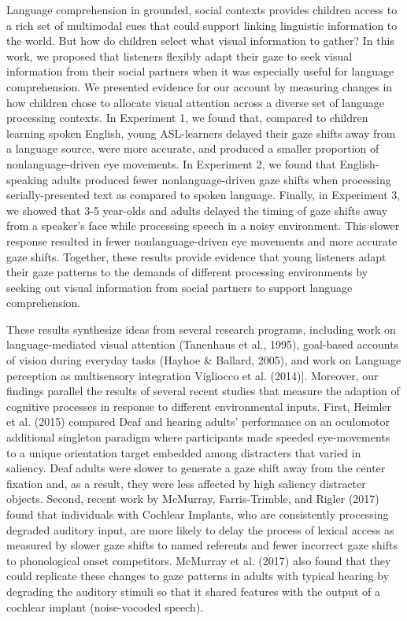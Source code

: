 \documentclass[english,floatsintext,man]{apa6}
\begin{document}
Language comprehension in grounded, social contexts provides children
access to a rich set of multimodal cues that could support linking
linguistic information to the world. But how do children select what
visual information to gather? In this work, we proposed that listeners
flexibly adapt their gaze to seek visual information from their social
partners when it was especially useful for language comprehension. We
presented evidence for our account by measuring changes in how children
chose to allocate visual attention across a diverse set of language
processing contexts. In Experiment 1, we found that, compared to
children learning spoken English, young ASL-learners delayed their gaze
shifts away from a language source, were more accurate, and produced a
smaller proportion of nonlanguage-driven eye movements. In Experiment 2,
we found that English-speaking adults produced fewer nonlanguage-driven
gaze shifts when processing serially-presented text as compared to
spoken language. Finally, in Experiment 3, we showed that 3-5 year-olds
and adults delayed the timing of gaze shifts away from a speaker's face
while processing speech in a noisy environment. This slower response
resulted in fewer nonlanguage-driven eye movements and more accurate
gaze shifts. Together, these results provide evidence that young
listeners adapt their gaze patterns to the demands of different
processing environments by seeking out visual information from social
partners to support language comprehension.

These results synthesize ideas from several research programs, including
work on language-mediated visual attention (Tanenhaus et al., 1995),
goal-based accounts of vision during everyday tasks (Hayhoe \& Ballard,
2005), and work on Language perception as multisensory integration
Vigliocco et al. (2014){]}. Moreover, our findings parallel the results
of several recent studies that measure the adaption of cognitive
processes in response to different environmental inputs. First, Heimler
et al. (2015) compared Deaf and hearing adults' performance on an
oculomotor additional singleton paradigm where participants made speeded
eye-movements to a unique orientation target embedded among distracters
that varied in saliency. Deaf adults were slower to generate a gaze
shift away from the center fixation and, as a result, they were less
affected by high saliency distracter objects. Second, recent work by
McMurray, Farris-Trimble, and Rigler (2017) found that individuals with
Cochlear Implants, who are consistently processing degraded auditory
input, are more likely to delay the process of lexical access as
measured by slower gaze shifts to named referents and fewer incorrect
gaze shifts to phonological onset competitors. McMurray et al. (2017)
also found that they could replicate these changes to gaze patterns in
adults with typical hearing by degrading the auditory stimuli so that it
shared features with the output of a cochlear implant (noise-vocoded
speech).
\end{document}
